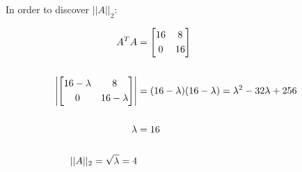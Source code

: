 		In order to discover $||A||_{2}$:

		\begin{align}
			A^{T}A &= \begin{bmatrix}
					16 & 8 \\[0.3em]
					0 & 16
				\end{bmatrix}& \\
				\notag \\
			\left| \begin{bmatrix}
					16-\lambda & 8 \\[0.3em]
					0 & 16-\lambda
				\end{bmatrix} \right| &=  (16-\lambda)(16-\lambda) = \lambda^{2} - 32\lambda + 256& \\
				\notag \\
				\lambda &= 16& \\
				\notag \\
				||A||_{2} = \sqrt{\lambda} = 4
		\label{eq:65beigen}
		\end{align}